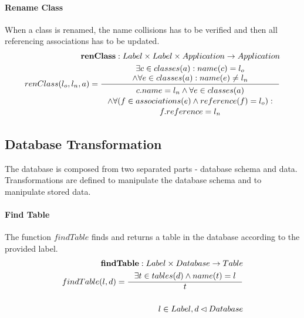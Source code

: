 \documentclass[11pt]{article}
\begin{document}
\paragraph{Rename Class} When a class is renamed, the name collisions has to be verified and then all referencing associations has to be updated.
\begin{align*}
	\mathbf{renClass} :  Label \times Label \times Application \rightarrow Application \\
	renClass(l_o, l_n, a) = \inference{\exists c \in classes(a) : name(c) = l_o \\ \wedge \forall e \in classes(a) : name(e) \neq l_n
	}{\begin{gathered}
		c.name = l_n \wedge \forall e \in classes(a) \\ \wedge \forall (f \in associations(e) \wedge reference(f) = l_o ) :\\ f.reference = l_n 
	\end{gathered}}
\end{align*}

\subsection{Database Transformation}
The database is composed from two separated parts - database schema and data. Transformations are defined to manipulate the database schema and to manipulate stored data. 

\paragraph{Find Table} The function $findTable$ finds and returns a table in the database according to the provided label.
\begin{align*}
	\mathbf{findTable} : Label \times Database \rightarrow Table  \\
	findTable(l, d) = \inference{\exists t \in tables(d) \wedge name(t) = l}{t}  \\ \\
	l \in Label, d \lhd Database
\end{align*}
\end{document}
